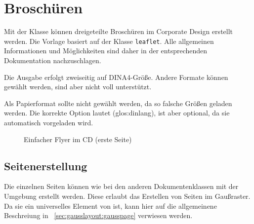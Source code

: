 \chapter{Broschüren}

Mit der Klasse  können dreigeteilte Broschüren
im Corporate Design erstellt werden.
Die Vorlage basiert auf der Klasse \texttt{leaflet}.
Alle allgemeinen Informationen und Möglichkeiten sind daher in der
entsprechenden Dokumentation\cite{cls:leaflet} nachzuschlagen.

Die Ausgabe erfolgt zweiseitig auf DINA4-Größe.
Andere Formate können gewählt werden, sind aber nicht voll unterstützt.

\begin{important}
  Als Papierformat sollte nicht  gewählt werden,
  da so falsche Größen geladen werden. Die korrekte Option lautet
   (\gls{glos:dinlang}),
  ist aber optional, da sie automatisch vorgeladen wird.
\end{important}


\begin{figure}[!ht]
  \caption{Einfacher Flyer im CD (erste Seite)}
  \label{fig:leaflet:example}
\end{figure}

% 
% 
% 

\section{Seitenerstellung}

Die einzelnen Seiten können wie bei den anderen Dokumentenklassen
mit der Umgebung  erstellt werden.
Diese erlaubt das Erstellen von Seiten im Gaußraster.
Da sie ein universelles Element von \tubslatex ist, kann hier auf die
allgemeinene Beschreiung in \chaptername~\ref{sec:gausslayout:gausspage}
verwiesen werden.


